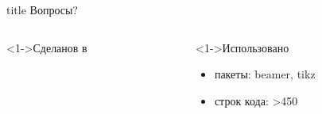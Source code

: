 \documentclass[pdf,9pt,aspectratio=169]{beamer}
\begin{document}
\begin{frame}{}
  \vfill
  \begin{beamercolorbox}[sep=8pt,center,shadow=true,rounded=true]{title}
    Вопросы?
  \end{beamercolorbox}
  \vfill
  \begin{columns}[T]
    \begin{column}[]{0.45\textwidth}  
      \begin{exampleblock}<1->{Сделанов в}
        \begin{center}
           \Huge\LaTeXe
        \end{center}
      \end{exampleblock}
    \end{column}
    \begin{column}[]{0.45\textwidth}  
      \begin{block}<1->{Использовано}
        \begin{itemize}
          \item пакеты: beamer, tikz
          \item строк кода: >450 
        \end{itemize}
      \end{block}
    \end{column}
  \end{columns}
  \vfill
\end{frame}
\end{document}
